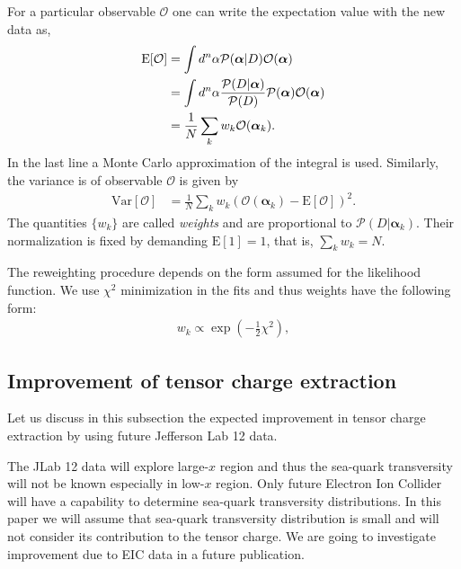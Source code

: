 \documentclass[twocolumn,showpacs,preprintnumbers,amsmath,amssymb,floatfix,prd]{revtex4}
\begin{document}
For a particular observable $\mathcal{O}$ one can write the expectation value 
with the new data as,
%
\begin{align}
\text{E}[\mathcal{O}]
&=	\int d^n\alpha \mathcal{P}(\bm{\alpha}|D)
	\mathcal{O}(\bm{\alpha})\notag\\
&=	\int d^n\alpha \frac{\mathcal{P}(D|\bm{\alpha})}{\mathcal{P}(D)} 
	\mathcal{P}(\bm{\alpha})\mathcal{O}(\bm{\alpha})\notag\\
&=	\frac{1}{N} \sum_k w_k \mathcal{O}(\bm{\alpha}_k).
\label{eq:E}
\end{align}
%
In the last line  a Monte Carlo approximation of the integral is used.
Similarly, the variance is of observable $\mathcal{O}$ is given by
%
\begin{align}
\text{Var}[\mathcal{O}]
&=\frac{1}{N} \sum_k w_k (\mathcal{O}(\bm{\alpha}_k)-\text{E}
[\mathcal{O}])^2 .
\label{eq:Var}
\end{align}
%
The quantities $\{w_k\}$ are called \emph{weights} and are proportional to 
$\mathcal{P}(D|\bm{\alpha}_k)$. 
Their normalization is fixed by demanding $\text{E}[1]=1$, that is,  
$\sum_k w_k=N$.

The reweighting procedure depends on the form assumed for the likelihood 
function. We use $\chi^2$ minimization in the fits and thus weights have the following form:
\begin{align}
	w_k \propto \exp\left(-\frac{1}{2}\chi^2\right),
\label{eq:bayes1}
\end{align}

\subsection{Improvement of tensor charge extraction}
%
Let us discuss in this subsection the expected improvement in tensor charge extraction by using future Jefferson Lab 12 data.

The JLab 12 data will explore large-$x$ region and thus the sea-quark transversity will not be
known especially in low-$x$ region. Only future Electron Ion Collider will have a capability to determine sea-quark transversity distributions.  In this paper we will assume that sea-quark transversity distribution is small and will not consider its contribution to the tensor charge. We are going to investigate improvement due to EIC data in a future publication.
\end{document}
